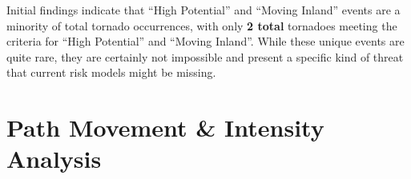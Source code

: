 \documentclass[
  letterpaper,
  DIV=11,
  numbers=noendperiod]{scrreprt}
\begin{document}
\begin{table}

\caption{\label{tbl-population-breakdown}}


\end{table}%

Initial findings indicate that ``High Potential'' and ``Moving Inland''
events are a minority of total tornado occurrences, with only \textbf{2
total} tornadoes meeting the criteria for ``High Potential'' and
``Moving Inland''. While these unique events are quite rare, they are
certainly not impossible and present a specific kind of threat that
current risk models might be missing.

\section{Path Movement \& Intensity
Analysis}\label{path-movement-intensity-analysis}
\end{document}
